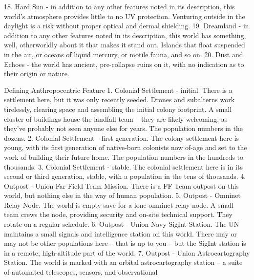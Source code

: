                                                                                                          


    18. Hard Sun - in addition to any other features noted in its description, this world’s  
        atmosphere provides little to no UV protection. Venturing outside in the daylight is a risk  
        without proper optical and dermal shielding.   
    19. Dreamland - in addition to any other features noted in its description, this world has  
        something, well, otherworldly about it that makes it stand out. Islands that float suspended  
        in the air, or oceans of liquid mercury, or motile fauna, and so on.   
    20. Dust and Echoes - the world has ancient, pre-collapse ruins on it, with no indication as to  
        their origin or nature.  

Defining Anthropocentric Feature   
    1.  Colonial Settlement - initial. There is a settlement here, but it was only recently seeded.  
        Drones and subalterns work tirelessly, clearing space and assembling the initial colony  
        footprint. A small cluster of buildings house the landfall team -- they are likely welcoming,  
        as they’ve probably not seen anyone else for years. The population numbers in the  
        dozens.   
    2.  Colonial Settlement - first generation. The colony settlement here is young, with its first  
        generation of native-born colonists now of-age and set to the work of building their future  
        home. The population numbers in the hundreds to thousands.   
    3.  Colonial Settlement - stable. The colonial settlement here is in its second or third  
        generation, stable, with a population in the tens of thousands.   
    4.  Outpost - Union Far Field Team Mission. There is a FF Team outpost on this world, but  
        nothing else in the way of human population.   
    5.  Outpost - Omninet Relay Node. The world is empty save for a lone omninet relay node. A  
        small team crews the node, providing security and on-site technical support. They rotate  
        on a regular schedule.   
    6.  Outpost - Union Navy SigInt Station. The UN maintains a small signals and intelligence  
        station on this world. There may or may not be other populations here -- that is up to you --  
        but the SigInt station is in a remote, high-altitude part of the world.   
    7.  Outpost - Union Astrocartography Station. The world is marked with an orbital  
        astrocartography station -- a suite of automated telescopes, sensors, and observational  
